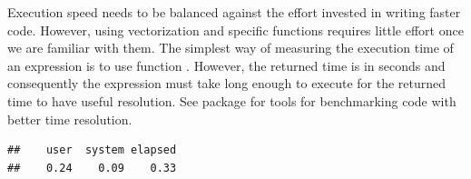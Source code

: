 \documentclass[krantz2]{krantz}\usepackage{knitr}%
\begin{document}
Execution speed needs to be balanced against the effort invested in writing faster code. However, using vectorization and specific \Rlang functions requires little effort once we are familiar with them. The simplest way of measuring the execution time of an \Rlang expression is to use function . However, the returned time is in seconds and consequently the expression must take long enough to execute for the returned time to have useful resolution. See package  for tools for benchmarking code with better time resolution.

\begin{knitrout}\footnotesize
{}\color{fgcolor}\begin{kframe}
\begin{alltt}
 \hlkwb{<-} \hlstd{()}
               \hlopt{:}\hlstd{) \{}
               \hlkwb{<-}  \hlopt{/} 
              \hlstd{\}}
            \hlstd{\})}
\end{alltt}
\begin{verbatim}
##    user  system elapsed 
##    0.24    0.09    0.33
\end{verbatim}
\end{kframe}
\end{knitrout}
\end{document}
